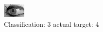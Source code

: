 \begin{figure}[h!]
\begin{center}
\includegraphics[width=0.60\columnwidth]{figures/ID2050_class_3_target_4.png}
\end{center}
\caption{ Classification: 3 actual target: 4}
\label{fig:ID2050_class_3_target_4}
\end{figure}
